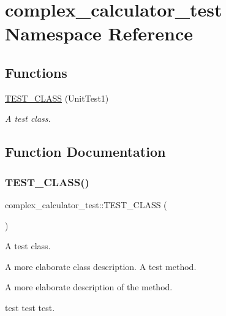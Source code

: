 \hypertarget{namespacecomplex__calculator__test}{}\section{complex\+\_\+calculator\+\_\+test Namespace Reference}
\label{namespacecomplex__calculator__test}
\subsection*{Functions}
\begin{DoxyCompactItemize}
\item 
\mbox{\hyperlink{namespacecomplex__calculator__test_ae3054d8337f87242e78ca38644ad504e}{T\+E\+S\+T\+\_\+\+C\+L\+A\+SS}} (Unit\+Test1)
\begin{DoxyCompactList}\small\item\em A test class. \end{DoxyCompactList}\end{DoxyCompactItemize}


\subsection{Function Documentation}
\mbox{\label{namespacecomplex__calculator__test_ae3054d8337f87242e78ca38644ad504e}} 
\subsubsection{\texorpdfstring{T\+E\+S\+T\+\_\+\+C\+L\+A\+S\+S()}{TEST\_CLASS()}}
{\footnotesize\ttfamily complex\+\_\+calculator\+\_\+test\+::\+T\+E\+S\+T\+\_\+\+C\+L\+A\+SS (\begin{DoxyParamCaption}\item[{Unit\+Test1}]{ }\end{DoxyParamCaption})}



A test class. 

A more elaborate class description. A test method.

A more elaborate description of the method.

test test test. 